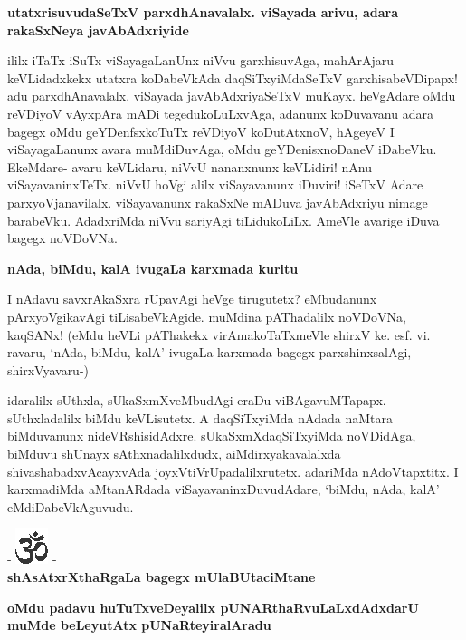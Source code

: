 {\bigskip
\noindent
{\large\bf utatxrisuvudaSeTxV parxdhAnavalalx. viSayada arivu, adara rakaSxNeya javAbAdxriyide}}\label{page176}
\medskip

\noindent
ililx iTaTx iSuTx viSayagaLanUnx niVvu garxhisuvAga, mahArAjaru keVLidadxkekx utatxra koDabeVkAda daqSiTxyiMdaSeTxV garxhisabeVDipapx! adu parxdhAnavalalx. viSayada javAbAdxriyaSeTxV muKayx. heVgAdare oMdu reVDiyoV vAyxpAra mADi tegedukoLuLxvAga, adanunx koDuvavanu adara bagegx oMdu geYDenfsxkoTuTx reVDiyoV koDutAtxnoV, hAgeyeV I viSayagaLanunx avara muMdiDuvAga, oMdu geYDenisxnoDaneV iDabeVku. EkeMdare- avaru keVLidaru, niVvU nananxnunx keVLidiri! nAnu viSayavaninxTeTx. niVvU hoVgi alilx viSayavanunx iDuviri! iSeTxV Adare parxyoVjanavilalx. viSayavanunx rakaSxNe mADuva javAbAdxriyu nimage barabeVku. AdadxriMda niVvu sariyAgi tiLidukoLiLx. AmeVle avarige iDuva bagegx noVDoVNa.

{\bigskip
\noindent
{\large\bf nAda, biMdu, kalA ivugaLa karxmada kuritu}}\label{page177}
\medskip

\noindent
I nAdavu savxrAkaSxra rUpavAgi heVge tirugutetx? eMbudanunx pArxyoVgikavAgi tiLisabeVkAgide. muMdina pAThadalilx noVDoVNa, kaqSANx! (eMdu heVLi pAThakekx virAmakoTaTxmeVle shirxV ke. esf. vi. ravaru, `nAda, biMdu, kalA' ivugaLa karxmada bagegx parxshinxsalAgi, shirxVyavaru-)


idaralilx sUthxla, sUkaSxmXveMbudAgi eraDu viBAgavuMTapapx. sUthxladalilx biMdu keVLisutetx. A daqSiTx\-yiMda nAdada naMtara biMduvanunx nideVRshisidAdxre. sUkaSxmXdaqSiTxyiMda noVDidAga, biMduvu shUnayx sAthxnadalilxdudx, aiMdirxyakavalalxda shivashabadxvAcayxvAda joyxVtiVrUpadalilxrutetx. adariMda nAdoVtapxtitx. I karxmadiMda aMtanARdada viSayavaninxDuvudAdare, `biMdu, nAda, kalA' eMdiDabeVkAguvudu.


\bigskip

\begin{center}
- \includegraphics{om.eps} -\\[8pt]
{\bf\Large{shAsAtxrXthaRgaLa bagegx mUlaBUtaciMtane}}
\end{center}


{\medskip
\noindent
{\large\bf oMdu padavu huTuTxveDeyalilx pUNARthaRvuLaLxdAdxdarU muMde beLe\-yutAtx pUNaRteyira\-lAradu}}\label{page177}
\medskip

